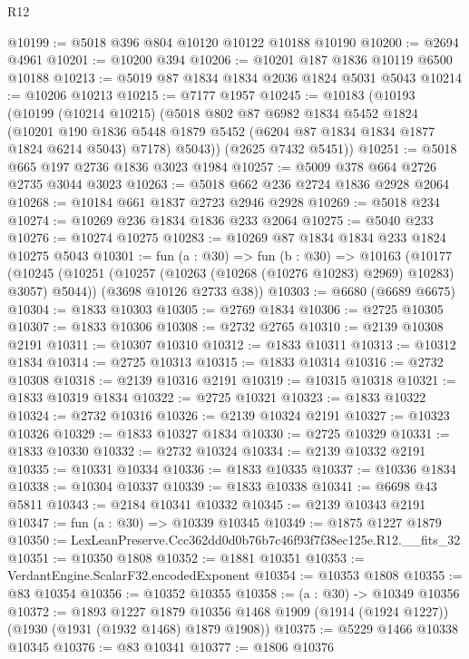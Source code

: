 \begin{lexlean}{R12}
\begin{coremodule}
@10199 := @5018 @396 @804 @10120 @10122 @10188 @10190
@10200 := @2694 @4961
@10201 := @10200 @394
@10206 := @10201 @187 @1836 @10119 @6500 @10188
@10213 := @5019 @87 @1834 @1834 @2036 @1824 @5031 @5043
@10214 := @10206 @10213
@10215 := @7177 @1957
@10245 := @10183
    (@10193
      (@10199
        (@10214 @10215)
        (@5018
          @802
          @87
          @6982
          @1834
          @5452
          @1824
          (@10201
            @190
            @1836
            @5448
            @1879
            @5452
            (@6204 @87 @1834 @1834 @1877 @1824 @6214 @5043)
            @7178)
          @5043))
      (@2625 @7432 @5451))
@10251 := @5018 @665 @197 @2736 @1836 @3023 @1984
@10257 := @5009 @378 @664 @2726 @2735 @3044 @3023
@10263 := @5018 @662 @236 @2724 @1836 @2928 @2064
@10268 := @10184 @661 @1837 @2723 @2946 @2928
@10269 := @5018 @234
@10274 := @10269 @236 @1834 @1836 @233 @2064
@10275 := @5040 @233
@10276 := @10274 @10275
@10283 := @10269 @87 @1834 @1834 @233 @1824 @10275 @5043
@10301 := fun (a : @30) =>
  fun (b : @30) =>
  @10163
    (@10177
      (@10245 (@10251 (@10257 (@10263 (@10268 (@10276 @10283) @2969) @10283) @3057) @5044))
      (@3698 @10126 @2733 @38))
@10303 := @6680 (@6689 @6675)
@10304 := @1833 @10303
@10305 := @2769 @1834
@10306 := @2725 @10305
@10307 := @1833 @10306
@10308 := @2732 @2765
@10310 := @2139 @10308 @2191
@10311 := @10307 @10310
@10312 := @1833 @10311
@10313 := @10312 @1834
@10314 := @2725 @10313
@10315 := @1833 @10314
@10316 := @2732 @10308
@10318 := @2139 @10316 @2191
@10319 := @10315 @10318
@10321 := @1833 @10319 @1834
@10322 := @2725 @10321
@10323 := @1833 @10322
@10324 := @2732 @10316
@10326 := @2139 @10324 @2191
@10327 := @10323 @10326
@10329 := @1833 @10327 @1834
@10330 := @2725 @10329
@10331 := @1833 @10330
@10332 := @2732 @10324
@10334 := @2139 @10332 @2191
@10335 := @10331 @10334
@10336 := @1833 @10335
@10337 := @10336 @1834
@10338 := @10304 @10337
@10339 := @1833 @10338
@10341 := @6698 @43 @5811
@10343 := @2184 @10341 @10332
@10345 := @2139 @10343 @2191
@10347 := fun (a : @30) => @10339 @10345
@10349 := @1875 @1227 @1879
@10350 := LexLeanPreserve.Ccc362dd0d0b76b7c46f93f7f38ec125e.R12.__fits_32
@10351 := @10350 @1808
@10352 := @1881 @10351
@10353 := VerdantEngine.ScalarF32.encodedExponent
@10354 := @10353 @1808
@10355 := @83 @10354
@10356 := @10352 @10355
@10358 := (a : @30) -> @10349 @10356
@10372 := @1893
    @1227
    @1879
    @10356
    @1468
    @1909
    (@1914 (@1924 @1227))
    (@1930 (@1931 (@1932 @1468) @1879 @1908))
@10375 := @5229 @1466 @10338 @10345
@10376 := @83 @10341
@10377 := @1806 @10376

\end{coremodule}
\end{lexlean}
